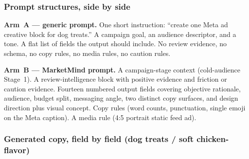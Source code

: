 \documentclass[12pt,a4paper]{report}
\begin{document}
\subsubsection*{Prompt structures, side by side}

\textbf{Arm~A --- generic prompt.} One short instruction: ``create one Meta ad creative block for dog treats.'' A campaign goal, an audience descriptor, and a tone. A flat list of fields the output should include. No review evidence, no schema, no copy rules, no media rules, no caution rules.

\textbf{Arm~B --- MarketMind prompt.} A campaign-stage context (cold-audience Stage~1). A review-intelligence block with positive evidence and friction or caution evidence. Fourteen numbered output fields covering objective rationale, audience, budget split, messaging angle, two distinct copy surfaces, and design direction plus visual concept. Copy rules (word counts, punctuation, single emoji on the Meta caption). A media rule (4:5 portrait static feed ad).

\subsubsection*{Generated copy, field by field (dog treats / soft chicken-flavor)}
\end{document}
